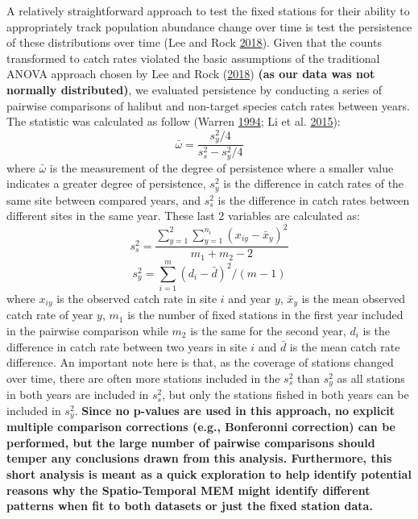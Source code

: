 \documentclass[12pt]{article}\usepackage[]{graphicx}\usepackage[]{color}
\begin{document}
A relatively straightforward approach to test the fixed stations for their ability to appropriately track population abundance change over time is test the persistence of these distributions over time (Lee and Rock \protect\hyperlink{ref-Lee2018}{2018}). Given that the counts transformed to catch rates violated the basic assumptions of the traditional ANOVA approach chosen by Lee and Rock (\protect\hyperlink{ref-Lee2018}{2018}) \textbf{(as our data was not normally distributed)}, we evaluated persistence by conducting a series of pairwise comparisons of halibut and non-target species catch rates between years. The statistic was calculated as follow (Warren \protect\hyperlink{ref-Warren1994}{1994}; Li et al. \protect\hyperlink{ref-Li2015}{2015}):
\begin{equation}
\bar{\omega} = \frac{s^2_y/4}{s^2_s-s^2_y/4}
\end{equation}
where \(\bar{\omega}\) is the measurement of the degree of persistence where a smaller value indicates a greater degree of persistence, \(s^2_y\) is the difference in catch rates of the same site between compared years, and \(s^2_s\) is the difference in catch rates between different sites in the same year. These last 2 variables are calculated as:
\begin{equation}
s^2_s = \frac{\sum_{y=1}^2 \sum_{y=1}^{n_i} (x_{iy}-\bar{x}_y)^2}{m_1+m_2-2}
\end{equation} \begin{equation}
s^2_y = \sum_{i=1}^m (d_i - \bar{d})^2 / (m-1)
\end{equation}
where \(x_{iy}\) is the observed catch rate in site \(i\) and year \(y\), \(\bar{x}_y\) is the mean observed catch rate of year \(y\), \(m_1\) is the number of fixed stations in the first year included in the pairwise comparison while \(m_2\) is the same for the second year, \(d_i\) is the difference in catch rate between two years in site \(i\) and \(\bar{d}\) is the mean catch rate difference. An important note here is that, as the coverage of stations changed over time, there are often more stations included in the \(s^2_s\) than \(s^2_y\) as all stations in both years are included in \(s^2_s\), but only the stations fished in both years can be included in \(s^2_y\). \textbf{Since no p-values are used in this approach, no explicit multiple comparison corrections (e.g., Bonferonni correction) can be performed, but the large number of pairwise comparisons should temper any conclusions drawn from this analysis. Furthermore, this short analysis is meant as a quick exploration to help identify potential reasons why the Spatio-Temporal MEM might identify different patterns when fit to both datasets or just the fixed station data.}
\end{document}
